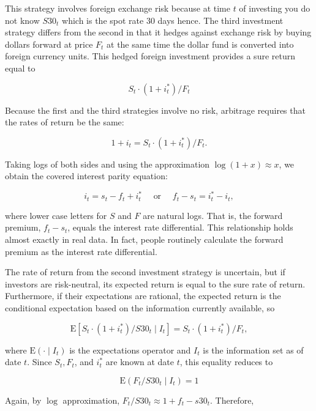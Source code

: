 \documentclass[10pt]{article}
\begin{document}
This strategy involves foreign exchange risk because at time $t$ of investing you do not know $S 30_{t}$ which is the spot rate 30 days hence. The third investment strategy differs from the second in that it hedges against exchange risk by buying dollars forward at price $F_{t}$ at the same time the dollar fund is converted into foreign currency units. This hedged foreign investment provides a sure return equal to

$$
S_{t} \cdot\left(1+i_{t}^{*}\right) / F_{t}
$$

Because the first and the third strategies involve no risk, arbitrage requires that the rates of return be the same:

$$
1+i_{t}=S_{t} \cdot\left(1+i_{t}^{*}\right) / F_{t} .
$$

Taking logs of both sides and using the approximation $\log (1+x) \approx x$, we obtain the covered interest parity equation:


\begin{equation*}
i_{t}=s_{t}-f_{t}+i_{t}^{*} \quad \text { or } \quad f_{t}-s_{t}=i_{t}^{*}-i_{t}, \tag{6.8.1}
\end{equation*}


where lower case letters for $S$ and $F$ are natural logs. That is, the forward premium, $f_{t}-s_{t}$, equals the interest rate differential. This relationship holds almost exactly in real data. In fact, people routinely calculate the forward premium as the interest rate differential.

The rate of return from the second investment strategy is uncertain, but if investors are risk-neutral, its expected return is equal to the sure rate of return. Furthermore, if their expectations are rational, the expected return is the conditional expectation based on the information currently available, so


\begin{equation*}
\mathrm{E}\left[S_{t} \cdot\left(1+i_{t}^{*}\right) / S 30_{t} \mid I_{t}\right]=S_{t} \cdot\left(1+i_{t}^{*}\right) / F_{t}, \tag{6.8.2}
\end{equation*}


where $\mathrm{E}\left(\cdot \mid I_{t}\right)$ is the expectations operator and $I_{t}$ is the information set as of date $t$. Since $S_{t}, F_{t}$, and $i_{t}^{*}$ are known at date $t$, this equality reduces to

$$
\mathrm{E}\left(F_{t} / S 30_{t} \mid I_{t}\right)=1
$$

Again, by $\log$ approximation, $F_{t} / S 30_{t} \approx 1+f_{t}-s 30_{t}$. Therefore,
\end{document}
